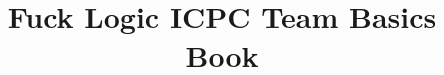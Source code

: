 \documentclass[a4paper,10pt]{article}
\title{\vspace{-4ex}\Large{Fuck Logic ICPC Team Basics Book}}
\author{}
\date{}
\begin{document}
\maketitle
\vspace{-13ex}
\tableofcontents
\pagestyle{fancy}


\begin{multicols}{2}

\end{multicols}
\end{document}
